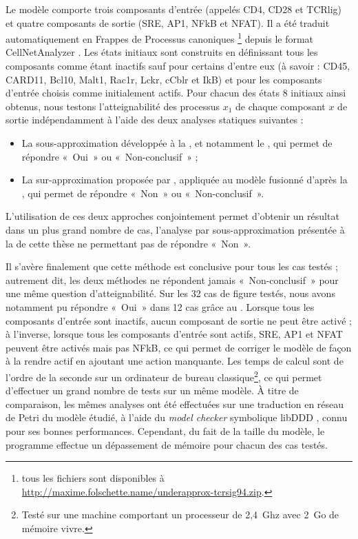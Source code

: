 Le modèle comporte trois composants d'entrée (appelés CD4, CD28 et TCRlig)
et quatre composants de sortie (SRE, AP1, NFkB et NFAT).
Il a été traduit automatiquement en Frappes de Processus canoniques%
\footnote{tous les fichiers sont disponibles à
\url{http://maxime.folschette.name/underapprox-tcrsig94.zip}.}
depuis le format CellNetAnalyzer \cite{klamt2007structural}.
Les états initiaux sont construits en définissant tous les composants
comme étant inactifs sauf pour certains d'entre eux
(à savoir : CD45, CARD11, Bcl10, Malt1, Rac1r, Lckr, cCblr et IkB)
et pour les composants d'entrée choisis comme initialement actifs.
Pour chacun des états 8 initiaux ainsi obtenus,
nous testons l'atteignabilité des processus $x_1$ de chaque composant $x$ de sortie
indépendamment à l'aide des deux analyses statiques suivantes :
\begin{itemize}
  \item La sous-approximation développée à la ,
    et notamment le ,
    qui permet de répondre «~Oui~» ou «~Non-conclusif~» ;
  \item La sur-approximation proposée par ,
    appliquée au modèle fusionné d'après la ,
    qui permet de répondre «~Non~» ou «~Non-conclusif~».
\end{itemize}
L'utilisation de ces deux approches conjointement permet d'obtenir un résultat dans un
plus grand nombre de cas,
l'analyse par sous-approximation présentée à la  de cette thèse
ne permettant pas de répondre «~Non~».

Il s'avère finalement que cette méthode est conclusive pour tous les cas testés ;
autrement dit, les deux méthodes ne répondent jamais «~Non-conclusif~»
pour une même question d'atteignabilité.
Sur les 32 cas de figure testés,
nous avons notamment pu répondre «~Oui~» dans 12 cas
grâce au .
Lorsque tous les composants d'entrée sont inactifs, aucun composant de sortie ne peut
être activé ;
à l'inverse, lorsque tous les composants d'entrée sont actifs,
SRE, AP1 et NFAT peuvent être activés mais pas NFkB,
ce qui permet de corriger le modèle de façon à la rendre actif en ajoutant une action manquante.
Les temps de calcul sont de l'ordre de la seconde sur un ordinateur
de bureau classique\footnote{Testé sur une machine comportant
un processeur de 2,4~Ghz avec 2~Go de mémoire vivre.},
ce qui permet d'effectuer un grand nombre de tests sur un même modèle.
À titre de comparaison, les mêmes analyses ont été effectuées 
sur une traduction en réseau de Petri du modèle étudié,
à l'aide du \textit{model checker} symbolique libDDD \cite{Kordon09libddd},
connu pour ses bonnes performances.
Cependant, du fait de la taille du modèle, le programme effectue un dépassement de mémoire
pour chacun des cas testés.

